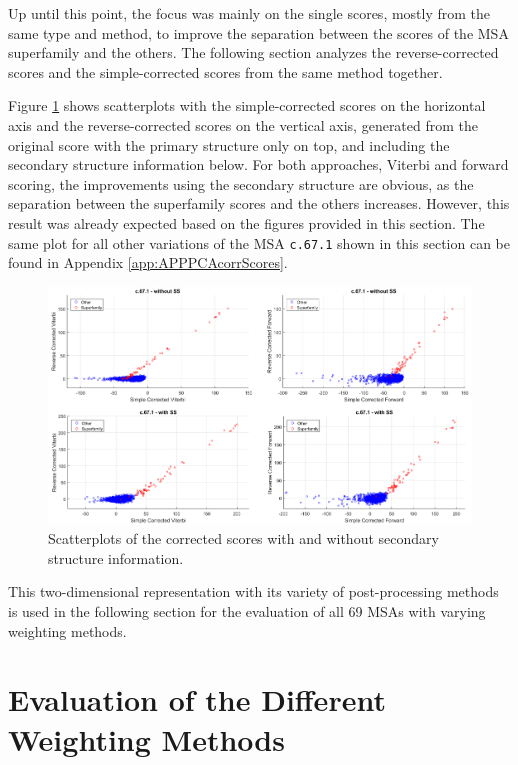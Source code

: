 
Up until this point, the focus was mainly on the single scores, mostly from the same type and method, to improve the separation between the scores of the \ac{MSA} superfamily and the others. The following section analyzes the reverse-corrected scores and the simple-corrected scores from the same method together.
 

Figure \ref{fig:scatter} shows scatterplots with the simple-corrected scores on the horizontal axis and the reverse-corrected scores on the vertical axis, generated from the original score with the primary structure only on top, and including the secondary structure information below. For both approaches, Viterbi and forward scoring, the improvements using the secondary structure are obvious, as the separation between the superfamily scores and the others increases. 
However, this result was already expected based on the figures provided in this section. The same plot for all other variations of the \ac{MSA} \texttt{c.67.1} shown in this section can be found in Appendix \ref{app:APPPCAcorrScores}. 


\begin{figure}[H]
	\begin{center}
		\includegraphics[width=\textwidth]{fig/scatter}
	\end{center}
	\caption{Scatterplots of the corrected scores with and without secondary structure information.}	
	\label{fig:scatter}
\end{figure}

This two-dimensional representation with its variety of post-processing methods is used in the following section for the evaluation of all 69 \acp{MSA} with varying weighting methods.


\section{Evaluation of the Different Weighting Methods}
\label{sec:weightingMeth}

